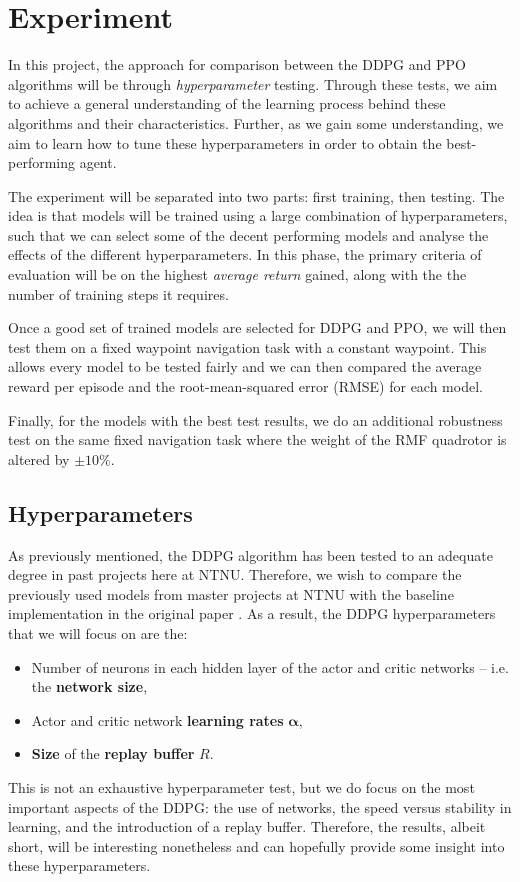 \section{Experiment}
\label{sec:4_Experiment}

In this project, the approach for comparison between the DDPG and PPO algorithms will be through \textit{hyperparameter} testing. Through these tests, we aim to achieve a general understanding of the learning process behind these algorithms and their characteristics. Further, as we gain some understanding, we aim to learn how to tune these hyperparameters in order to obtain the best-performing agent. 

The experiment will be separated into two parts: first training, then testing. The idea is that models will be trained using a large combination of hyperparameters, such that we can select some of the decent performing models and analyse the effects of the different hyperparameters. In this phase, the primary criteria of evaluation will be on the highest \textit{average return} gained, along with the the number of training steps it requires.

Once a good set of trained models are selected for DDPG and PPO, we will then test them on a fixed waypoint navigation task with a constant waypoint.
This allows every model to be tested fairly and we can then compared the average reward per episode and the root-mean-squared error (RMSE) for each model. 

Finally, for the models with the best test results, we do an additional robustness test on the same fixed navigation task where the weight of the RMF quadrotor is altered by $\pm 10\%$. 


\subsection{Hyperparameters}
\label{subsec:4_6_hyperparameters}
As previously mentioned, the DDPG algorithm has been tested to an adequate degree in past projects here at NTNU. Therefore, we wish to compare the previously used models from master projects at NTNU with the baseline implementation in the original paper \cite{DDPG}. 
As a result, the DDPG hyperparameters that we will focus on are the:
\begin{itemize}
    \item Number of neurons in each hidden layer of the actor and critic networks -- i.e. the \textbf{network size},
    \item Actor and critic network \textbf{learning rates} $\boldsymbol{\alpha}$,
    \item \textbf{Size} of the \textbf{replay buffer} $R$.
\end{itemize}
This is not an exhaustive hyperparameter test, but we do focus on the most important aspects of the DDPG: the use of networks, the speed versus stability in learning, and the introduction of a replay buffer. Therefore, the results, albeit short, will be interesting nonetheless and can hopefully provide some insight into these hyperparameters.


